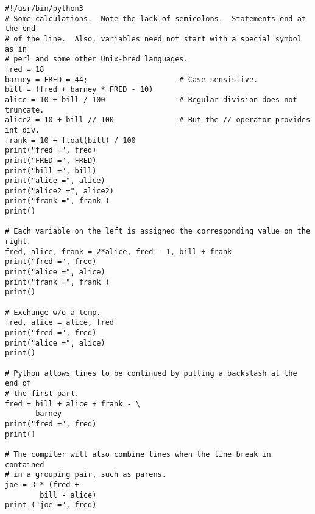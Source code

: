 \begin{verbatim}
#!/usr/bin/python3
# Some calculations.  Note the lack of semicolons.  Statements end at the end
# of the line.  Also, variables need not start with a special symbol as in
# perl and some other Unix-bred languages.
fred = 18
barney = FRED = 44;                     # Case sensistive.
bill = (fred + barney * FRED - 10)
alice = 10 + bill / 100                 # Regular division does not truncate.
alice2 = 10 + bill // 100               # But the // operator provides int div.
frank = 10 + float(bill) / 100
print("fred =", fred)
print("FRED =", FRED)
print("bill =", bill)
print("alice =", alice)
print("alice2 =", alice2)
print("frank =", frank )
print()

# Each variable on the left is assigned the corresponding value on the right.
fred, alice, frank = 2*alice, fred - 1, bill + frank
print("fred =", fred)
print("alice =", alice)
print("frank =", frank )
print()

# Exchange w/o a temp.
fred, alice = alice, fred
print("fred =", fred)
print("alice =", alice)
print()

# Python allows lines to be continued by putting a backslash at the end of
# the first part.  
fred = bill + alice + frank - \
       barney
print("fred =", fred)
print()

# The compiler will also combine lines when the line break in contained
# in a grouping pair, such as parens.
joe = 3 * (fred +
        bill - alice)
print ("joe =", fred)
\end{verbatim}
